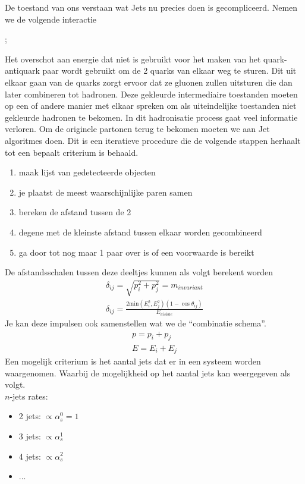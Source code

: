 \documentclass[../main.tex]{subfiles}
\begin{document}
De toestand van ons verstaan wat Jets nu precies doen is gecompliceerd. Nemen we de volgende interactie\\
\begin{center}
;
\end{center}
Het overschot aan energie dat niet is gebruikt voor het maken van het quark-antiquark paar wordt gebruikt om de 2 quarks van elkaar weg te sturen. Dit uit elkaar gaan van de quarks zorgt ervoor dat ze gluonen zullen uitsturen die dan later combineren tot hadronen. Deze gekleurde intermediaire toestanden moeten op een of andere manier met elkaar spreken om als uiteindelijke toestanden niet gekleurde hadronen te bekomen. In dit hadronisatie process gaat veel informatie verloren. Om de originele partonen terug te bekomen moeten we aan Jet algoritmes doen. Dit is een iteratieve procedure die de volgende stappen herhaalt tot een bepaalt criterium is behaald.
\begin{enumerate}
    \item maak lijst van gedetecteerde objecten
    \item je plaatst de meest waarschijnlijke paren samen
    \item bereken de afstand tussen de 2
    \item degene met de kleinste afstand tussen elkaar worden gecombineerd
    \item ga door tot nog maar 1 paar over is of een voorwaarde is bereikt
\end{enumerate}
De afstandsschalen tussen deze deeltjes kunnen als volgt berekent worden
\begin{equation}
    \begin{aligned}
        \label{eq:jet_alg_afstand}
        \delta_{ij} = \sqrt{p_i^2+p_j^2} = m_{invariant}\\
        \delta_{ij} = \frac{2\text{min}(E_i^2,E_j^2)(1-\cos\theta_{ij})}{E_{visible}} 
    \end{aligned}
\end{equation}
Je kan deze impulsen ook samenstellen wat we de ``combinatie schema''.
\begin{equation}
    \begin{aligned}
        \label{eq:comb_scheme}
        p=p_i+p_j\\
        E=E_i+E_j
    \end{aligned}
\end{equation}
Een mogelijk criterium is het aantal jets dat er in een systeem worden waargenomen. Waarbij de mogelijkheid op het aantal jets kan weergegeven als volgt.\\
$n$-jets rates:
\begin{itemize}
    \item 2 jets: $\propto \alpha_s^0 = 1$
    \item 3 jets: $\propto \alpha_s^1$
    \item 4 jets: $\propto \alpha_s^2$
    \item ...
\end{itemize}
\end{document}
